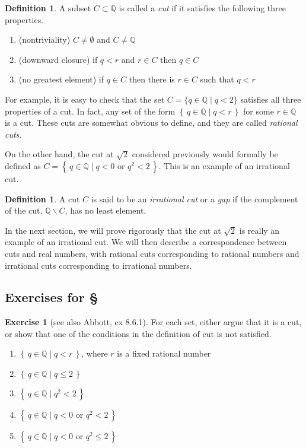 \documentclass[11pt,oneside]{amsbook}
\newcommand{\set}[1]{\left\{\,#1\,\right\}}
\newcommand{\Q}{\mathbb Q}
\renewcommand{\setminus}{\smallsetminus}
\theoremstyle{definition}
\newtheorem{exerc}{Exercise}[section]
\theoremstyle{plain}
\theoremstyle{definition}
\newtheorem{defn}[thm]{Definition}
\theoremstyle{remark}
\numberwithin{equation}{section}
\numberwithin{figure}{section}
\begin{document}
\begin{defn}
  A subset $C\subset\Q$ is called a \emph{cut} if it satisfies the following three properties.
  \begin{enumerate}
  \item (nontriviality) $C\neq\emptyset$ and $C\neq\Q$
  \item (downward closure) if $q<r$ and $r\in C$ then $q\in C$
  \item (no greatest element) if $q\in C$ then there is $r\in C$ such that $q<r$
  \end{enumerate}
\end{defn}

For example, it is easy to check that the set $C=\{q\in\Q\mid q<2\}$ satisfies all three properties of a cut. In fact, any set of the form $\set{q\in\Q\mid q<r}$ for some $r\in\Q$ is a cut. These cuts are somewhat obvious to define, and they are called \emph{rational cuts}.

On the other hand, the cut at $\sqrt{2}$ considered previously would formally be defined as $C=\set{q\in\Q\mid q<0\text{ or }q^2<2}$. This is an example of an irrational cut.

\begin{defn}
  A cut $C$ is said to be an \emph{irrational cut} or a \emph{gap} if the complement of the cut, $\Q\setminus C$, has no least element.
\end{defn}

In the next section, we will prove rigorously that the cut at $\sqrt{2}$ is really an example of an irrational cut. We will then describe a correspondence between cuts and real numbers, with rational cuts corresponding to rational numbers and irrational cuts corresponding to irrational numbers.

\newpage
\subsection*{Exercises for \S \thesection}

\begin{exerc}[see also Abbott, ex 8.6.1]
  For each set, either argue that it is a cut, or show that one of the conditions in the definition of cut is not satisfied.
  \begin{enumerate}
  \item $\set{q\in\Q\mid q<r}$, where $r$ is a fixed rational number
  \item $\set{q\in\Q\mid q\leq2}$
  \item $\set{q\in\Q\mid q^2<2}$
  \item $\set{q\in\Q\mid q<0\text{ or }q^2<2}$
  \item $\set{q\in\Q\mid q<0\text{ or }q^2\leq2}$
  \end{enumerate}
\end{exerc}
\end{document}
